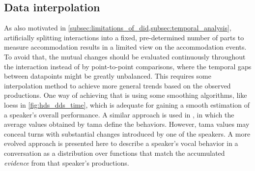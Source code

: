 \begin{description}
%	
\end{description}

\subsection[Data interpolation using kriging]{Data interpolation}
\label{subsec:interploating_data_using_kriging}

As also motivated in \cref{subsec:limitations_of_did,subsec:temporal_analysis}, artificially splitting interactions into a fixed, pre-determined number of parts to measure accommodation results in a limited view on the accommodation events.
To avoid that, the mutual changes should be evaluated continuously throughout the interaction instead of by point-to-point comparisons, where the temporal gaps between datapoints might be greatly unbalanced.
This requires some interpolation method to achieve more general trends based on the observed productions.
One way of achieving that is using some smoothing algorithms, like \ac{loess} in  \cref{fig:hds_dds_time}, which is adequate for gaining a smooth estimation of a speaker's overall performance.
A similar approach is used in \citet{Galvez2020unifiying}, in which the average values obtained by \acl{tama} \citep[\acs{tama};][]{Kousidis2008towards, Kousidis2009monitoring} define the behaviors.
However, \ac{tama} values may conceal turns with substantial changes introduced by one of the speakers.
A more evolved approach is presented here to describe a speaker's vocal behavior in a conversation as a distribution over functions that match the accumulated \textit{evidence} from that speaker's productions.

